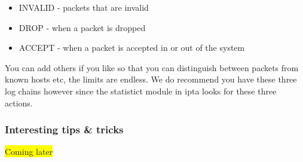 \documentclass[english,twoside,openright,a4paper,12pt]{article}
\newcommand{\hilight}[1]{\colorbox{yellow}{#1}}
\begin{document}
\begin{itemize}
	\item INVALID - packets that are invalid
	\item DROP - when a packet is dropped
	\item ACCEPT - when a packet is accepted in or out of the system
\end{itemize}

You can add others if you like so that you can distinguish between packets from known hosts etc, the limits are endless. We do recommend you have these three log chains however since the statistict module in ipta looks for these three actions.

\subsubsection{Interesting tips \& tricks}

\hilight{Coming later}
\end{document}
